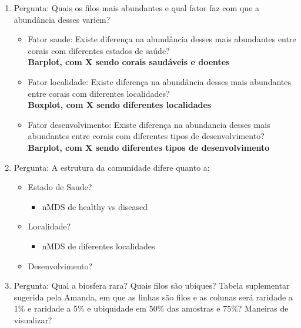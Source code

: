 \documentclass[12pt, a4paper]{report}
\begin{document}
\begin{enumerate}
\item Pergunta: Quais os filos mais abundantes e qual fator faz com que a abundância desses variem? 
	\begin{itemize}
	\item Fator saude: Existe diferença na abundância desses mais abundantes entre corais com diferentes estados de saúde?\\
	\textbf{Barplot, com X sendo corais saudáveis e doentes}
	\item Fator localidade: Existe diferença na abundância desses mais abundantes entre corais com diferentes localidades?\\
	\textbf{Boxplot, com X sendo diferentes localidades}
	\item Fator desenvolvimento: Existe diferença na abundancia desses mais abundantes entre corais com diferentes tipos de desenvolvimento?\\
	\textbf{Barplot, com X sendo diferentes tipos de desenvolvimento}
	\end{itemize}
\item Pergunta: A estrutura da comunidade difere quanto a:
	\begin{itemize}
	\item Estado de Saude?
		\begin{itemize}
		\item nMDS de healthy vs diseased
		\end{itemize}
	\item Localidade? 
		\begin{itemize}
		\item nMDS de diferentes localidades
		\end{itemize}
	\item Desenvolvimento?
	\end{itemize}
\item Pergunta: Qual a biosfera rara? Quais filos são ubíques?
Tabela suplementar sugerida pela Amanda, em que as linhas são filos e as colunas será raridade a 1\% e raridade a 5\% e ubiquidade em 50\% das amostras e 75\%? 
Maneiras de visualizar?
\end{enumerate}

 
 



 
\end{document}
